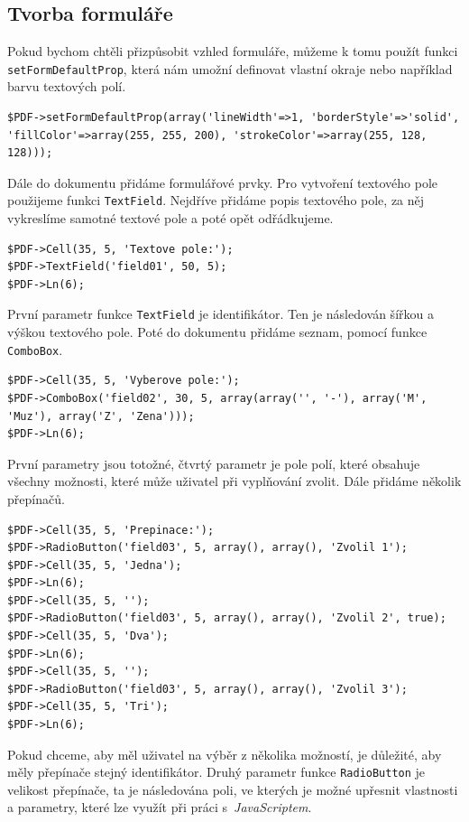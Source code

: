 \documentclass[czech,BP]{thesiskiv}
\begin{document}
\subsection{Tvorba formuláře}
Pokud bychom chtěli přizpůsobit vzhled formuláře, můžeme k tomu použít funkci \texttt{setFormDefaultProp}, která nám umožní definovat vlastní okraje nebo například barvu textových polí. 
\begin{lstlisting}[firstnumber=6]
$PDF->setFormDefaultProp(array('lineWidth'=>1, 'borderStyle'=>'solid', 'fillColor'=>array(255, 255, 200), 'strokeColor'=>array(255, 128, 128)));
\end{lstlisting}
Dále do dokumentu přidáme formulářové prvky. Pro vytvoření textového pole použijeme funkci \texttt{TextField}. Nejdříve přidáme popis textového pole, za něj vykreslíme samotné textové pole a poté opět odřádkujeme.
\begin{lstlisting}[firstnumber=7]
$PDF->Cell(35, 5, 'Textove pole:');
$PDF->TextField('field01', 50, 5);
$PDF->Ln(6);
\end{lstlisting}
První parametr funkce \texttt{TextField} je identifikátor. Ten je následován šířkou a výškou textového pole. Poté do dokumentu přidáme seznam, pomocí funkce \texttt{ComboBox}.
\begin{lstlisting}[firstnumber=10]
$PDF->Cell(35, 5, 'Vyberove pole:');
$PDF->ComboBox('field02', 30, 5, array(array('', '-'), array('M', 'Muz'), array('Z', 'Zena')));
$PDF->Ln(6);
\end{lstlisting}
První parametry jsou totožné, čtvrtý parametr je pole polí, které obsahuje všechny možnosti, které může uživatel při vyplňování zvolit. Dále přidáme několik přepínačů.
\begin{lstlisting}[firstnumber=13]
$PDF->Cell(35, 5, 'Prepinace:');
$PDF->RadioButton('field03', 5, array(), array(), 'Zvolil 1');
$PDF->Cell(35, 5, 'Jedna');
$PDF->Ln(6);
$PDF->Cell(35, 5, '');
$PDF->RadioButton('field03', 5, array(), array(), 'Zvolil 2', true);
$PDF->Cell(35, 5, 'Dva');
$PDF->Ln(6);
$PDF->Cell(35, 5, '');
$PDF->RadioButton('field03', 5, array(), array(), 'Zvolil 3');
$PDF->Cell(35, 5, 'Tri');
$PDF->Ln(6);
\end{lstlisting}
Pokud chceme, aby měl uživatel na výběr z několika možností, je důležité, aby měly přepínače stejný identifikátor. Druhý parametr funkce \texttt{RadioButton} je velikost přepínače, ta je následována poli, ve kterých je možné upřesnit vlastnosti a parametry, které lze využít při práci s~\emph{JavaScriptem}. 
\end{document}
